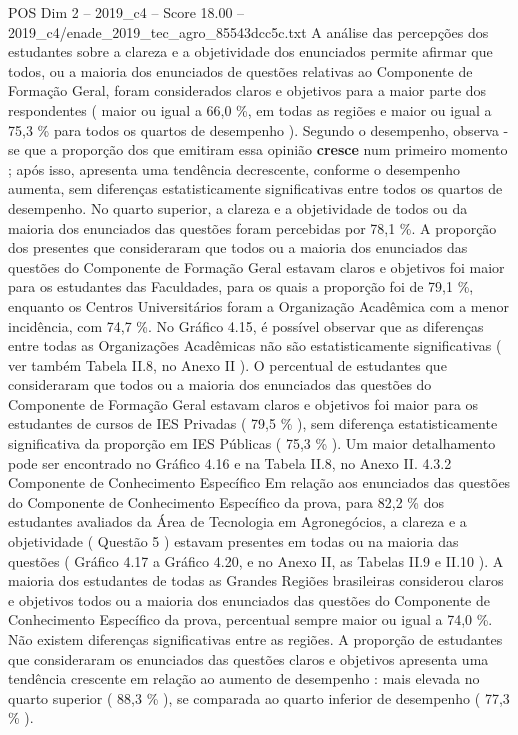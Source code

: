 \begin{textsample}{POS Dim 2 – 2019\_c4 – Score 18.00 – 2019\_c4/enade\_2019\_tec\_agro\_85543dcc5c.txt}
A análise das percepções dos estudantes sobre a clareza e a objetividade dos enunciados permite afirmar que todos, ou a maioria dos enunciados de questões relativas ao Componente de Formação Geral, foram considerados claros e objetivos para a maior parte dos respondentes ( maior ou igual a 66,0 \%, em todas as regiões e maior ou igual a 75,3 \% para todos os quartos de desempenho ).
Segundo o desempenho, observa -se que a proporção dos que emitiram essa opinião \textbf{cresce} num primeiro momento ; após isso, apresenta uma tendência decrescente, conforme o desempenho aumenta, sem diferenças estatisticamente significativas entre todos os quartos de desempenho.
No quarto superior, a clareza e a objetividade de todos ou da maioria dos enunciados das questões foram percebidas por 78,1 \%.
A proporção dos presentes que consideraram que todos ou a maioria dos enunciados das questões do Componente de Formação Geral estavam claros e objetivos foi maior para os estudantes das Faculdades, para os quais a proporção foi de 79,1 \%, enquanto os Centros Universitários foram a Organização Acadêmica com a menor incidência, com 74,7 \%.
No Gráfico 4.15, é possível observar que as diferenças entre todas as Organizações Acadêmicas não são estatisticamente significativas ( ver também Tabela II.8, no Anexo II ).
O percentual de estudantes que consideraram que todos ou a maioria dos enunciados das questões do Componente de Formação Geral estavam claros e objetivos foi maior para os estudantes de cursos de IES Privadas ( 79,5 \% ), sem diferença estatisticamente significativa da proporção em IES Públicas ( 75,3 \% ).
Um maior detalhamento pode ser encontrado no Gráfico 4.16 e na Tabela II.8, no Anexo II. 4.3.2 Componente de Conhecimento Específico Em relação aos enunciados das questões do Componente de Conhecimento Específico da prova, para 82,2 \% dos estudantes avaliados da Área de Tecnologia em Agronegócios, a clareza e a objetividade ( Questão 5 ) estavam presentes em todas ou na maioria das questões ( Gráfico 4.17 a Gráfico 4.20, e no Anexo II, as Tabelas II.9 e II.10 ).
A maioria dos estudantes de todas as Grandes Regiões brasileiras considerou claros e objetivos todos ou a maioria dos enunciados das questões do Componente de Conhecimento Específico da prova, percentual sempre maior ou igual a 74,0 \%.
Não existem diferenças significativas entre as regiões.
A proporção de estudantes que consideraram os enunciados das questões claros e objetivos apresenta uma tendência crescente em relação ao aumento de desempenho : mais elevada no quarto superior ( 88,3 \% ), se comparada ao quarto inferior de desempenho ( 77,3 \% ).

\end{textsample}
